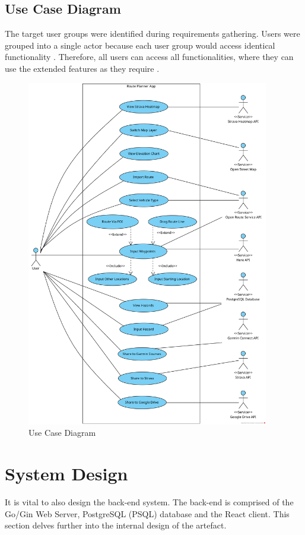 \subsection{Use Case Diagram}
\label{usecase:diagram}
The target user groups were identified during requirements gathering. Users were grouped into a single actor because each user group would access identical functionality . Therefore, all users can access all functionalities, where they can use the extended features as they require .

\begin{figure}[!ht]
  \centering
  \includegraphics[width=400px]{figures/use-case.png}
  \caption{Use Case Diagram}
  \label{fig:usecase}
\end{figure}

\section{System Design}
\label{design:system}

It is vital to also design the back-end system. The back-end is comprised of the Go/Gin Web Server, PostgreSQL (PSQL) database and the React client. This section delves further into the internal design of the artefact. 

